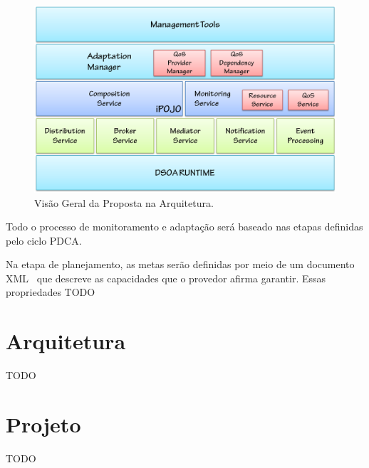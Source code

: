 \begin{figure}[htp]
\centering
\includegraphics[width=12cm]{chapters/chapter4/proposal_dsoa.png}
\caption[Visão Geral da Proposta na Arquitetura]{Visão Geral da Proposta na Arquitetura.}
\label{fig:proposal}
\end{figure}

Todo o processo de monitoramento e adaptação será baseado nas etapas definidas pelo ciclo PDCA. 

Na etapa de planejamento, as metas serão definidas por meio de um documento XML~\cite{xml} que descreve as capacidades que o provedor afirma garantir. Essas propriedades TODO

\section{Arquitetura}
TODO

\section{Projeto}
TODO